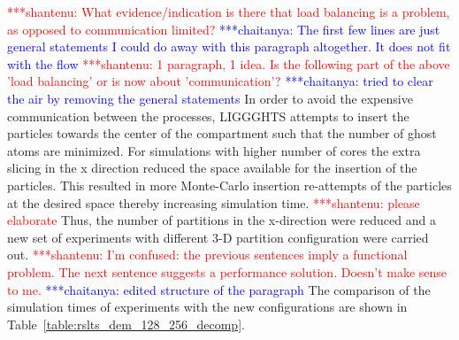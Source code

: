 \documentclass[preprint,11pt,authoryear]{elsarticle}
\newcommand{\jhanote}[1]{ {\textcolor{red} { ***shantenu: #1 }}}
\newcommand{\csnote}[1]{ {\textcolor{blue} { ***chaitanya: #1 }}}
\newcommand{\jhanote}[1]{ {\textcolor{red} { ***shantenu: #1 }}}
\newcommand{\csnote}[1]{}
\begin{document}
\jhanote{What evidence/indication is there that load balancing is
a problem, as opposed to communication limited?} 
\csnote{The first few lines 
are  just general statements I could do away with this paragraph altogether. 
It does not fit with the flow} %
\jhanote{1 paragraph, 1 idea. Is the following part of the above 'load balancing' or is 
now about 'communication'?} \csnote{tried to clear the air by removing the general statements} 
In order to avoid the expensive communication
between the processes, LIGGGHTS attempts to insert the particles towards the
center of the compartment such that the number of ghost atoms are minimized.
For simulations with higher number of cores the extra slicing in the x direction 
reduced the space available for the insertion of the particles.
This resulted in more Monte-Carlo insertion re-attempts of the particles at the desired space 
thereby increasing simulation time.
\jhanote{please elaborate} 
Thus, the number of partitions in the x-direction were reduced and a new set of 
experiments with different 3-D partition configuration were carried out. 
\jhanote{I'm
confused: the previous sentences imply a functional problem. The next sentence
suggests a performance solution. Doesn't make sense to me.} 
\csnote{edited structure of the paragraph}
The comparison of the simulation times of experiments with the new configurations are shown in
Table~\ref{table:rslts_dem_128_256_decomp}.
\end{document}
